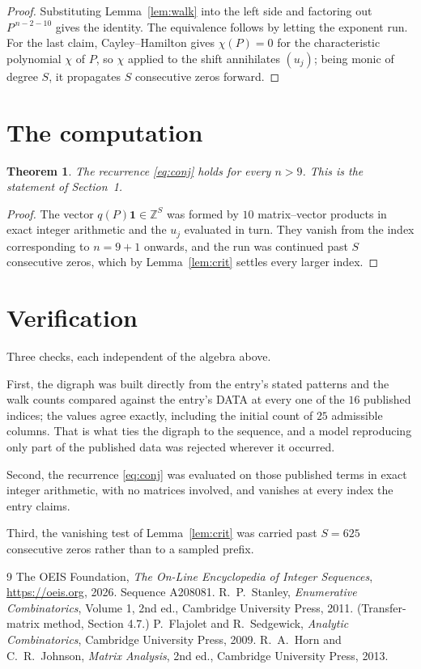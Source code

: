 \documentclass[11pt,a4paper]{article}
\theoremstyle{plain}
\newtheorem{theorem}{Theorem}
\theoremstyle{definition}
\begin{document}
\begin{proof}
Substituting Lemma~\ref{lem:walk} into the left side and factoring out
$P^{\,n-2-10}$ gives the identity. The equivalence follows by letting the exponent
run. For the last claim, Cayley--Hamilton gives $\chi(P)=0$ for the characteristic
polynomial $\chi$ of $P$, so $\chi$ applied to the shift annihilates $(u_j)$; being monic of
degree $S$, it propagates $S$ consecutive zeros forward.
\end{proof}

\section{The computation}

\begin{theorem}
The recurrence \eqref{eq:conj} holds for every $n>9$. This is the statement of
Section~1.
\end{theorem}

\begin{proof}
The vector $q(P)\mathbf{1}\in\mathbb{Z}^{S}$ was formed by $10$ matrix--vector
products in exact integer arithmetic and the $u_j$ evaluated in turn. They vanish from the
index corresponding to $n=9+1$ onwards, and the run was continued past $S$ consecutive
zeros, which by Lemma~\ref{lem:crit} settles every larger index.
\end{proof}

\section{Verification}

Three checks, each independent of the algebra above.

First, the digraph was built directly from the entry's stated patterns and the walk counts
compared against the entry's DATA at every one of the $16$ published indices; the
values agree exactly, including the initial count of $25$ admissible columns. That is
what ties the digraph to the sequence, and a model reproducing only part of the published
data was rejected wherever it occurred.

Second, the recurrence \eqref{eq:conj} was evaluated on those published terms in exact
integer arithmetic, with no matrices involved, and vanishes at every index the entry claims.

Third, the vanishing test of Lemma~\ref{lem:crit} was carried past $S=625$ consecutive
zeros rather than to a sampled prefix.

\begin{thebibliography}{9}
 The OEIS Foundation, \emph{The On-Line Encyclopedia of Integer
Sequences}, \url{https://oeis.org}, 2026. Sequence A208081.
 R.~P.~Stanley, \emph{Enumerative Combinatorics}, Volume 1, 2nd ed.,
Cambridge University Press, 2011. (Transfer-matrix method, Section 4.7.)
 P.~Flajolet and R.~Sedgewick, \emph{Analytic Combinatorics}, Cambridge
University Press, 2009.
 R.~A.~Horn and C.~R.~Johnson, \emph{Matrix Analysis}, 2nd ed., Cambridge
University Press, 2013.
\end{thebibliography}
\end{document}
